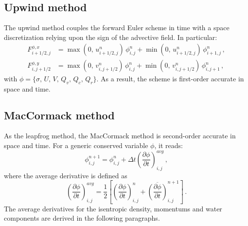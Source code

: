 \documentclass{article}
\numberwithin{equation}{section}
\begin{document}
	\subsection{Upwind method}
	\label{section:Upwind method}
		The upwind method couples the forward Euler scheme in time with a space discretization relying upon the sign of the advective field. In particular:
		\begin{subequations}
			\begin{align}
				F_{i+1/2,j}^{\phi,x} & = \max \left( 0, \, u_{i+1/2,j}^n \right) \, \phi_{i,j}^n + \min \left( 0, \, u_{i+1/2,j}^n \right) \, \phi_{i+1,j}^n \, , \\
				F_{i,j+1/2}^{\phi,y} & = \max \left( 0, \, v_{i,j+1/2}^n \right) \, \phi_{i,j}^n + \min \left( 0, \, v_{i,j+1/2}^n \right) \, \phi_{i,j+1}^n \, ,
			\end{align}
		\end{subequations}
		with $\phi = \lbrace \sigma, \, U, \, V, \, Q_v, \, Q_c, \, Q_r \rbrace$. As a result, the scheme is first-order accurate in space and time.
		
	\subsection{MacCormack method}
	\label{section:MacCormack method}
		As the leapfrog method, the MacCormack method is second-order accurate in space and time. For a generic conserved variable $\phi$, it reads:
		\begin{equation}
			\label{eq:mc}
			\phi_{i,j}^{n+1} = \phi_{i,j}^n + \Delta t \left( \dfrac{\partial \phi}{\partial t} \right)_{i,j}^{avg} \, ,
		\end{equation}
		where the average derivative is defined as
		\begin{equation}
			\label{eq:average-derivative}
			\left( \dfrac{\partial \phi}{\partial t} \right)_{i,j}^{avg} = \dfrac{1}{2} \left[ \left( \dfrac{\partial \phi}{\partial t} \right)_{i,j}^n + \overline{\left( \dfrac{\partial \phi}{\partial t} \right)}_{i,j}^{n+1} \right] \, .
		\end{equation}
		The average derivatives for the isentropic density, momentums and water components are derived in the following paragraphs.
\end{document}
